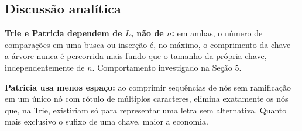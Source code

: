 \documentclass[11pt]{article}
\begin{document}
\begin{table}[htbp]
\centering
\renewcommand{\arraystretch}{1.5}
\setlength{\tabcolsep}{10pt}
\caption{Complexidade assintótica das operações fundamentais. $|\Sigma|$ denota o tamanho do alfabeto (26, neste trabalho). Para a KD-Tree em $\mathbb{R}^2$, a remoção possui custo médio $O(\log n)$ via localização recursiva do nó sucessor/mínimo no discriminador correspondente (a complexidade $O(\sqrt{n})$ aplica-se a consultas por faixa ortogonal).}
\label{tab:complexidade}
\end{table}

\subsection{Discussão analítica}

\textbf{Trie e Patricia dependem de $L$, não de $n$:} em ambas, o número de
comparações em uma busca ou inserção é, no máximo, o comprimento da chave --
a árvore nunca é percorrida mais fundo que o tamanho da própria chave,
independentemente de $n$. Comportamento investigado na Seção 5.

\textbf{Patricia usa menos espaço:} ao comprimir sequências de nós sem
ramificação em um único nó com rótulo de múltiplos caracteres, elimina
exatamente os nós que, na Trie, existiriam só para representar uma letra sem
alternativa. Quanto mais exclusivo o sufixo de uma chave, maior a economia.
\end{document}

